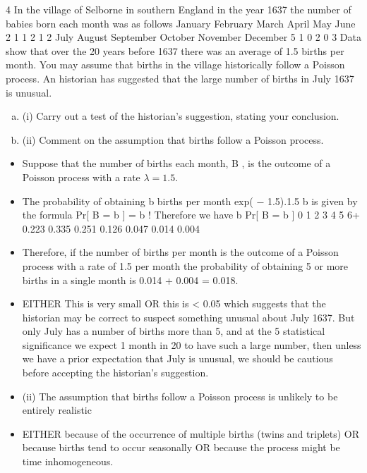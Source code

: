 \documentclass[a4paper,12pt]{article}
\begin{document}
4
In the village of Selborne in southern England in the year 1637 the number of babies
born each month was as follows
January
February
March
April
May
June
2
1
1
2
1
2
July
August
September
October
November
December
5
1
0
2
0
3
Data show that over the 20 years before 1637 there was an average of 1.5 births per
month. You may assume that births in the village historically follow a Poisson
process.
An historian has suggested that the large number of births in July 1637 is unusual.
\begin{enumerate}[(a)]
\item (i) Carry out a test of the historian’s suggestion, stating your conclusion.
\item (ii) Comment on the assumption that births follow a Poisson process.
\end{enumerate}


\newpage
\begin{itemize}
    \item
Suppose that the number of births each month, B , is the outcome of a Poisson
process with a rate $\lambda = 1.5$.
\item The probability of obtaining b births per month
exp( − 1.5).1.5 b
is given by the formula Pr[ B = b ] =
b !
Therefore we have
b Pr[ B = b ]
0
1
2
3
4
5
6+ 0.223
0.335
0.251
0.126
0.047
0.014
0.004
\item Therefore, if the number of births per month is the
outcome of a Poisson process with a rate of 1.5 per
month the probability of obtaining 5 or more births in
a single month is 0.014 + 0.004 = 0.018.
\item EITHER This is very small OR this is < 0.05
which suggests that the historian may be correct
to suspect something unusual about July 1637.
But only July has a number of births more than 5, and at the 5%
statistical significance we expect 1 month in 20 to have such a large
number, then unless we have a prior expectation that July is unusual, we
should be cautious before accepting the historian’s suggestion.
\item (ii)
The assumption that births follow a Poisson process is
unlikely to be entirely realistic
\item EITHER because of the occurrence of multiple births
(twins and triplets)
OR because births tend to occur seasonally
OR because the process might be time inhomogeneous.
\end{itemize}
\end{document}
